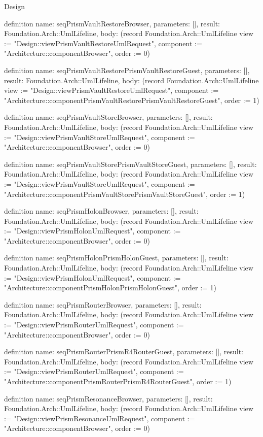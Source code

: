 \begin{lexlean}{Design}
\begin{semanticmodule}
definition{
  name: seqPrismVaultRestoreBrowser,
  parameters: [],
  result: Foundation.Arch::UmlLifeline,
  body: (record Foundation.Arch::UmlLifeline {view := "Design::viewPrismVaultRestoreUmlRequest", component := "Architecture::componentBrowser", order := 0})
}

definition{
  name: seqPrismVaultRestorePrismVaultRestoreGuest,
  parameters: [],
  result: Foundation.Arch::UmlLifeline,
  body: (record Foundation.Arch::UmlLifeline {view := "Design::viewPrismVaultRestoreUmlRequest", component := "Architecture::componentPrismVaultRestorePrismVaultRestoreGuest", order := 1})
}

definition{
  name: seqPrismVaultStoreBrowser,
  parameters: [],
  result: Foundation.Arch::UmlLifeline,
  body: (record Foundation.Arch::UmlLifeline {view := "Design::viewPrismVaultStoreUmlRequest", component := "Architecture::componentBrowser", order := 0})
}

definition{
  name: seqPrismVaultStorePrismVaultStoreGuest,
  parameters: [],
  result: Foundation.Arch::UmlLifeline,
  body: (record Foundation.Arch::UmlLifeline {view := "Design::viewPrismVaultStoreUmlRequest", component := "Architecture::componentPrismVaultStorePrismVaultStoreGuest", order := 1})
}

definition{
  name: seqPrismHolonBrowser,
  parameters: [],
  result: Foundation.Arch::UmlLifeline,
  body: (record Foundation.Arch::UmlLifeline {view := "Design::viewPrismHolonUmlRequest", component := "Architecture::componentBrowser", order := 0})
}

definition{
  name: seqPrismHolonPrismHolonGuest,
  parameters: [],
  result: Foundation.Arch::UmlLifeline,
  body: (record Foundation.Arch::UmlLifeline {view := "Design::viewPrismHolonUmlRequest", component := "Architecture::componentPrismHolonPrismHolonGuest", order := 1})
}

definition{
  name: seqPrismRouterBrowser,
  parameters: [],
  result: Foundation.Arch::UmlLifeline,
  body: (record Foundation.Arch::UmlLifeline {view := "Design::viewPrismRouterUmlRequest", component := "Architecture::componentBrowser", order := 0})
}

definition{
  name: seqPrismRouterPrismR4RouterGuest,
  parameters: [],
  result: Foundation.Arch::UmlLifeline,
  body: (record Foundation.Arch::UmlLifeline {view := "Design::viewPrismRouterUmlRequest", component := "Architecture::componentPrismRouterPrismR4RouterGuest", order := 1})
}

definition{
  name: seqPrismResonanceBrowser,
  parameters: [],
  result: Foundation.Arch::UmlLifeline,
  body: (record Foundation.Arch::UmlLifeline {view := "Design::viewPrismResonanceUmlRequest", component := "Architecture::componentBrowser", order := 0})
}


\end{semanticmodule}
\end{lexlean}
